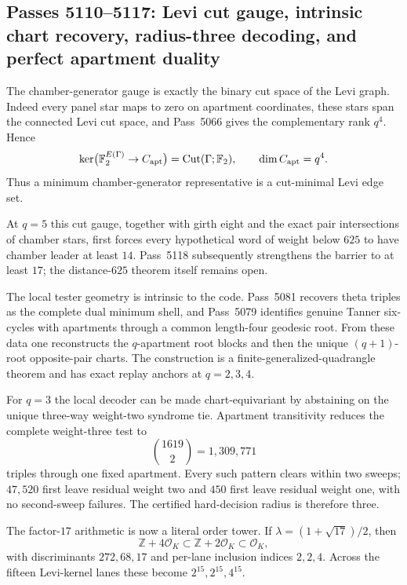 \ifdefined\WPassFiveOneOneZeroLoaded\else
\gdef\WPassFiveOneOneZeroLoaded{1}
\subsection*{Passes 5110--5117: Levi cut gauge, intrinsic chart recovery, radius-three decoding, and perfect apartment duality}
The chamber-generator gauge is exactly the binary cut space of the Levi graph.  Indeed every panel star maps to zero on apartment coordinates, these stars span the connected Levi cut space, and Pass~5066 gives the complementary rank $q^4$.  Hence
\[
 \ker\bigl(\mathbb F_2^{E(\Gamma)}\to C_{\rm apt}\bigr)=\operatorname{Cut}(\Gamma;\mathbb F_2),
 \qquad \dim C_{\rm apt}=q^4.
\]
Thus a minimum chamber-generator representative is a cut-minimal Levi edge set.

At $q=5$ this cut gauge, together with girth eight and the exact pair intersections of chamber stars, first forces every hypothetical word of weight below $625$ to have chamber leader at least $14$.  Pass~5118 subsequently strengthens the barrier to at least $17$; the distance-$625$ theorem itself remains open.

The local tester geometry is intrinsic to the code.  Pass~5081 recovers theta triples as the complete dual minimum shell, and Pass~5079 identifies genuine Tanner six-cycles with apartments through a common length-four geodesic root.  From these data one reconstructs the $q$-apartment root blocks and then the unique $(q+1)$-root opposite-pair charts.  The construction is a finite-generalized-quadrangle theorem and has exact replay anchors at $q=2,3,4$.

For $q=3$ the local decoder can be made chart-equivariant by abstaining on the unique three-way weight-two syndrome tie.  Apartment transitivity reduces the complete weight-three test to
\[
 \binom{1619}{2}=1,309,771
\]
triples through one fixed apartment.  Every such pattern clears within two sweeps; $47,520$ first leave residual weight two and $450$ first leave residual weight one, with no second-sweep failures.  The certified hard-decision radius is therefore three.

The factor-$17$ arithmetic is now a literal order tower.  If $\lambda=(1+\sqrt{17})/2$, then
\[
 \mathbb Z+4\mathcal O_K\subset \mathbb Z+2\mathcal O_K\subset \mathcal O_K,
\]
with discriminants $272,68,17$ and per-lane inclusion indices $2,2,4$.  Across the fifteen Levi-kernel lanes these become $2^{15},2^{15},4^{15}$.

